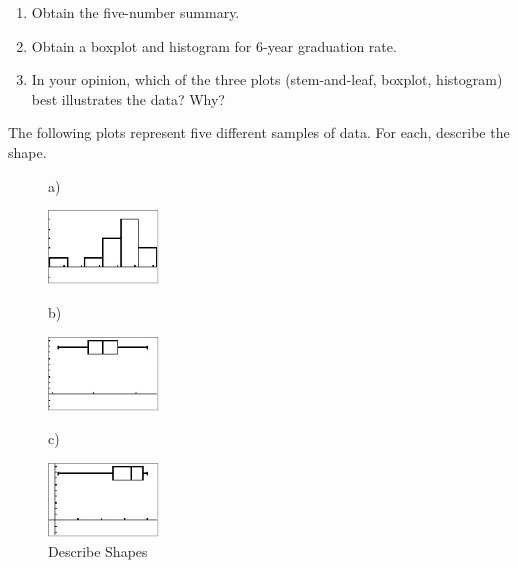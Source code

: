 \documentclass[11pt, chapterprefix=true]{scrbook}\usepackage[]{graphicx}\usepackage[]{color}
\begin{document}
\begin{exercises}
\begin{exercise}
	  \begin{enumerate}
	  \item Obtain the five-number summary.
    \item Obtain a boxplot and histogram for 6-year graduation rate.
    \item In your opinion, which of the three plots (stem-and-leaf, boxplot, histogram) best illustrates the data? Why?
	  \end{enumerate}

	\end{exercise}
%
%

\begin{exercise}  %

The following plots represent five different samples of data. For each, describe the shape.

\begin{figure}[ht]
  \caption{Describe Shapes}

\begin{minipage}[ht]{3cm}

  a)

  \includegraphics[width=83pt]{chapters/Chapter_2/ext_figure/boxq7.png}
  \end{minipage} \hfill
  \begin{minipage}[ht]{3cm}

  b)

  \includegraphics[width=83pt]{chapters/Chapter_2/ext_figure/boxq7b.png}
  \end{minipage} \hfill
  \begin{minipage}[ht]{3cm}

  c)

  \includegraphics[width=83pt]{chapters/Chapter_2/ext_figure/boxq7c.png}
  \end{minipage} \hfill
  \begin{minipage}[ht]{3cm}


\end{minipage}
\end{figure}
\end{exercise}
\end{exercises}
\end{document}
